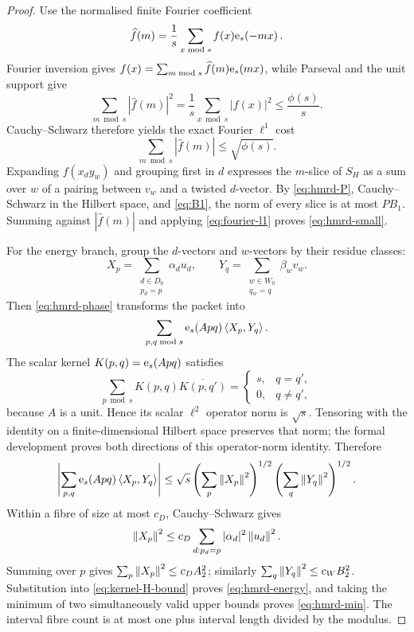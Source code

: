 \begin{proof}
Use the normalised finite Fourier coefficient
\[
 \widehat f(m)=\frac1s\sum_{x\bmod s}f(x)\mathrm e_{s}\!\left(-mx\right).
\]
Fourier inversion gives
$f(x)=\sum_{m\bmod s}\widehat f(m)\mathrm e_{s}\!\left(mx\right)$, while Parseval and the unit
support give
\[
 \sum_{m\bmod s}|\widehat f(m)|^2
   =\frac1s\sum_{x\bmod s}|f(x)|^2
   \le\frac{\phi(s)}s.
\]
Cauchy--Schwarz therefore yields the exact Fourier $\ell^1$ cost
\begin{equation}\label{eq:fourier-l1}
              \sum_{m\bmod s}|\widehat f(m)|\le\sqrt{\phi(s)}.
\end{equation}
Expanding $f(x_dy_w)$ and grouping first in $d$ expresses the $m$-slice of
$S_H$ as a sum over $w$ of a pairing between $v_w$ and a twisted $d$-vector.
By \cref{eq:hmrd-P}, Cauchy--Schwarz in the Hilbert space, and
\cref{eq:B1}, the norm of every slice is at most $PB_1$.  Summing against
$|\widehat f(m)|$ and applying \cref{eq:fourier-l1} proves
\cref{eq:hmrd-small}.

For the energy branch, group the $d$-vectors and $w$-vectors by their residue
classes:
\[
 X_p=\sum_{\substack{d\in D_0\\p_d=p}}\alpha_du_d,
 \qquad
 Y_q=\sum_{\substack{w\in W_0\\q_w=q}}\beta_wv_w.
\]
Then \cref{eq:hmrd-phase} transforms the packet into
\[
       \sum_{p,q\bmod s}\mathrm e_{s}\!\left(Apq\right)\left\langle X_p,Y_q\right\rangle.
\]
The scalar kernel $K(p,q)=\mathrm e_{s}\!\left(Apq\right)$ satisfies
\[
 \sum_{p\bmod s}K(p,q)\overline{K(p,q')}
  =\begin{cases}s,&q=q',\\0,&q\ne q',\end{cases}
\]
because $A$ is a unit.  Hence its scalar $\ell^2$ operator norm is $\sqrt s$.
Tensoring with the identity on a finite-dimensional Hilbert space preserves
that norm; the formal development proves both directions of this operator-norm
identity.  Therefore
\begin{equation}\label{eq:kernel-H-bound}
 \left|\sum_{p,q}\mathrm e_{s}\!\left(Apq\right)\left\langle X_p,Y_q\right\rangle\right|
 \le\sqrt s
      \left(\sum_p\left\lVert X_p\right\rVert^2\right)^{1/2}
      \left(\sum_q\left\lVert Y_q\right\rVert^2\right)^{1/2}.
\end{equation}
Within a fibre of size at most $c_D$, Cauchy--Schwarz gives
\[
 \left\lVert X_p\right\rVert^2\le c_D
   \sum_{d:p_d=p}|\alpha_d|^2\left\lVert u_d\right\rVert^2.
\]
Summing over $p$ gives $\sum_p\left\lVert X_p\right\rVert^2\le c_DA_2^2$; similarly
$\sum_q\left\lVert Y_q\right\rVert^2\le c_WB_2^2$.  Substitution into
\cref{eq:kernel-H-bound} proves \cref{eq:hmrd-energy}, and taking the minimum
of two simultaneously valid upper bounds proves \cref{eq:hmrd-min}.  The
interval fibre count is at most one plus interval length divided by the modulus.
\end{proof}

